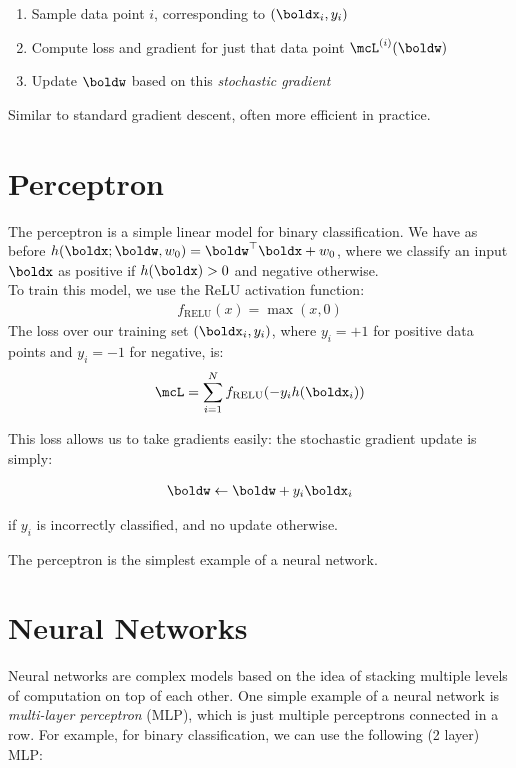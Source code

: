 \documentclass[12pt,letterpaper]{article}
\newcommand{\1}{\mathbbm{1}}
\begin{document}
  \begin{enumerate}
  \item Sample data point $i$, corresponding to $(\boldx_i, y_i)$
  \item Compute loss and gradient for just that data point $\mcL^{(i)}(\boldw)$
  \item Update $\boldw$ based on this \textit{stochastic gradient} 
  \end{enumerate}
 
  Similar to standard gradient descent, often more efficient in 
  practice. 


\section{Perceptron}

The perceptron is a simple linear model for binary classification. We have as before $h(\boldx; \boldw, w_0) = \boldw^\top \boldx + w_0$, where we classify an input $\boldx$ as positive if $h(\boldx) > 0$ and negative otherwise.\\

\noindent 
To train this model, we use the ReLU activation function:
\begin{align}
    f_{\operatorname{RELU}}(x) = \max(x, 0)
\end{align}
The loss over our training set $(\boldx_i, y_i)$, where $y_i = +1$ for positive data points and $y_i = -1$ for negative, is:
\begin{align}
  \mcL = \sum_{i=1}^N f_{\operatorname{RELU}}(-y_i h(\boldx_i))  
\end{align}

This loss allows us to take gradients easily: the stochastic gradient update is simply:

\begin{align}
    \boldw \gets \boldw + y_i\boldx_i
\end{align}

if $y_i$ is incorrectly classified, and no update otherwise.

The perceptron is the simplest example of a neural network. 

\section{Neural Networks}

Neural networks are complex models based on the idea of stacking multiple levels of computation on top of each other. One simple example of a neural network is \emph{multi-layer perceptron} (MLP), which is just multiple perceptrons connected in a row. For example, for binary classification, we can use the following (2 layer) MLP:
\end{document}
